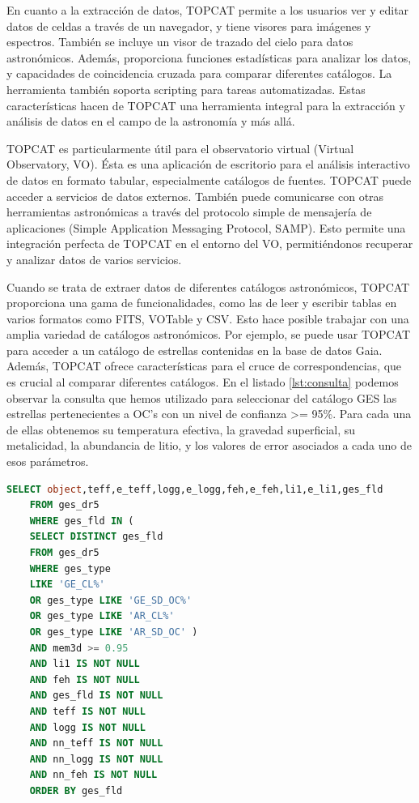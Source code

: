 En cuanto a la extracción de datos, TOPCAT permite a los usuarios ver y editar datos de celdas a través de un navegador, y tiene visores para imágenes y espectros. También se incluye un visor de trazado del cielo para datos astronómicos. Además, proporciona funciones estadísticas para analizar los datos, y capacidades de coincidencia cruzada para comparar diferentes catálogos. La herramienta también soporta scripting para tareas automatizadas. Estas características hacen de TOPCAT una herramienta integral para la extracción y análisis de datos en el campo de la astronomía y más allá.\par

TOPCAT es particularmente útil para el observatorio virtual (Virtual Observatory, VO). Ésta es una aplicación de escritorio para el análisis interactivo de datos en formato tabular, especialmente catálogos de fuentes. TOPCAT puede acceder a servicios de datos externos. También puede comunicarse con otras herramientas astronómicas a través del protocolo simple de mensajería de aplicaciones (Simple Application Messaging Protocol, SAMP). Esto permite una integración perfecta de TOPCAT en el entorno del VO, permitiéndonos recuperar y analizar datos de varios servicios.\par

Cuando se trata de extraer datos de diferentes catálogos astronómicos, TOPCAT proporciona una gama de funcionalidades, como las de leer y escribir tablas en varios formatos como FITS, VOTable y CSV. Esto hace posible trabajar con una amplia variedad de catálogos astronómicos. Por ejemplo, se puede usar TOPCAT para acceder a un catálogo de estrellas contenidas en la base de datos Gaia. Además, TOPCAT ofrece características para el cruce de correspondencias, que es crucial al comparar diferentes catálogos. En el listado \ref{lst:consulta} podemos observar la consulta que hemos utilizado para seleccionar del catálogo GES las estrellas pertenecientes a OC's con un nivel de confianza >= 95\%. Para cada una de ellas obtenemos su temperatura efectiva, la gravedad superficial, su metalicidad, la abundancia de litio, y los valores de error asociados a cada uno de esos parámetros.\par


\begin{lstlisting}[language=SQL, float, caption={Consulta TOPCAT sobre el catálogo GES DR5 para obtener los componentes de los cúmulos abiertos para los cuales se ha determinado una pertenecia mínima del 0.95\%. Las columnas obtenidas informan sobre el identificador de la estrella, $\teff$, $\gsurf$, $\feh$, A(Li) y sus errores asociados, y el identificador del cúmulo al que pertenece.}, label={lst:consulta}]
	SELECT object,teff,e_teff,logg,e_logg,feh,e_feh,li1,e_li1,ges_fld
	FROM ges_dr5 
	WHERE ges_fld IN (
	SELECT DISTINCT ges_fld
	FROM ges_dr5 
	WHERE ges_type 
	LIKE 'GE_CL%' 
	OR ges_type LIKE 'GE_SD_OC%' 
	OR ges_type LIKE 'AR_CL%' 
	OR ges_type LIKE 'AR_SD_OC' )
	AND mem3d >= 0.95
	AND li1 IS NOT NULL
	AND feh IS NOT NULL
	AND ges_fld IS NOT NULL
	AND teff IS NOT NULL
	AND logg IS NOT NULL
	AND nn_teff IS NOT NULL
	AND nn_logg IS NOT NULL
	AND nn_feh IS NOT NULL
	ORDER BY ges_fld
\end{lstlisting}

